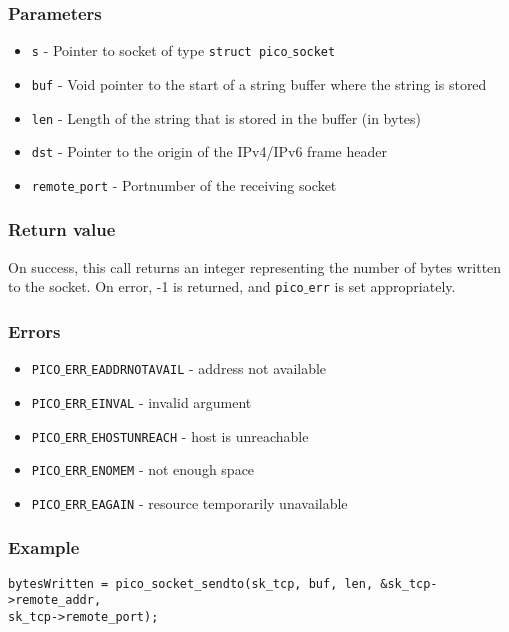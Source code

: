\subsubsection*{Parameters}
\begin{itemize}[noitemsep]
\item \texttt{s} - Pointer to socket of type \texttt{struct pico$\_$socket}
\item \texttt{buf} - Void pointer to the start of a string buffer where the string is stored
\item \texttt{len} - Length of the string that is stored in the buffer (in bytes)
\item \texttt{dst} - Pointer to the origin of the IPv4/IPv6 frame header
\item \texttt{remote$\_$port} - Portnumber of the receiving socket
\end{itemize}

\subsubsection*{Return value}
On success, this call returns an integer representing the number of bytes written to the socket.
On error, -1 is returned, and \texttt{pico$\_$err} is set appropriately.

\subsubsection*{Errors}
\begin{itemize}[noitemsep]
\item \texttt{PICO$\_$ERR$\_$EADDRNOTAVAIL} - address not available
\item \texttt{PICO$\_$ERR$\_$EINVAL} - invalid argument
\item \texttt{PICO$\_$ERR$\_$EHOSTUNREACH} - host is unreachable
\item \texttt{PICO$\_$ERR$\_$ENOMEM} - not enough space
\item \texttt{PICO$\_$ERR$\_$EAGAIN} - resource temporarily unavailable
\end{itemize}

\subsubsection*{Example}
\begin{verbatim}
bytesWritten = pico_socket_sendto(sk_tcp, buf, len, &sk_tcp->remote_addr,
sk_tcp->remote_port);
\end{verbatim}


